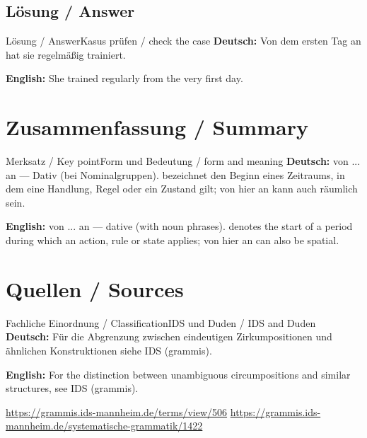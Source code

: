 \documentclass[a4paper,11pt]{article}
\newcommand{\GermanText}[1]{\textbf{Deutsch: }#1\par}
\newcommand{\EnglishText}[1]{{\small\color{SoftGray}\textbf{English: }#1\par}}
\begin{document}
\subsection{Lösung / Answer}
\begin{grammarentry}{Lösung / Answer}{Kasus prüfen / check the case}
\GermanText{Von dem ersten Tag an hat sie regelmäßig trainiert.}
\EnglishText{She trained regularly from the very first day.}
\end{grammarentry}
\section{Zusammenfassung / Summary}
\begin{grammarentry}{Merksatz / Key point}{Form und Bedeutung / form and meaning}
\GermanText{von ... an — Dativ (bei Nominalgruppen). bezeichnet den Beginn eines Zeitraums, in dem eine Handlung, Regel oder ein Zustand gilt; von hier an kann auch räumlich sein.}
\EnglishText{von ... an — dative (with noun phrases). denotes the start of a period during which an action, rule or state applies; von hier an can also be spatial.}
\end{grammarentry}
\section{Quellen / Sources}
\begin{grammarentry}{Fachliche Einordnung / Classification}{IDS und Duden / IDS and Duden}
\GermanText{Für die Abgrenzung zwischen eindeutigen Zirkumpositionen und ähnlichen Konstruktionen siehe IDS (grammis).}
\EnglishText{For the distinction between unambiguous circumpositions and similar structures, see IDS (grammis).}
\url{https://grammis.ids-mannheim.de/terms/view/506}
\url{https://grammis.ids-mannheim.de/systematische-grammatik/1422}
\end{grammarentry}
\end{document}
